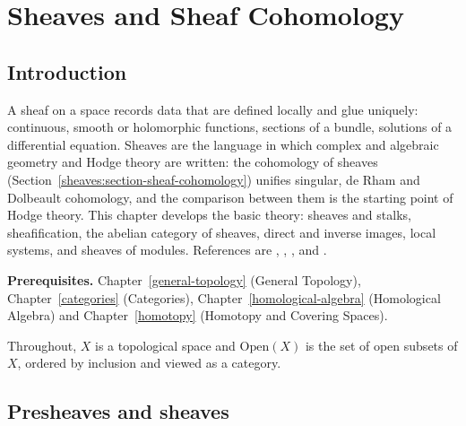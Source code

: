 \chapter{Sheaves and Sheaf Cohomology}\label{sheaves}

\section{Introduction}\label{sheaves:section-introduction}

A sheaf on a space records data that are defined locally and glue uniquely: continuous, smooth or holomorphic functions,
sections of a bundle, solutions of a differential equation. Sheaves are the language in which complex and algebraic geometry and
Hodge theory are written: the cohomology of sheaves (Section~\ref{sheaves:section-sheaf-cohomology}) unifies singular, de Rham and Dolbeault
cohomology, and the comparison between them is the starting point of Hodge theory. This chapter develops the basic theory: sheaves
and stalks, sheafification, the abelian category of sheaves, direct and inverse images, local systems, and sheaves of modules.
References are \cite{godement-faisceaux}, \cite{bredon-sheaf}, \cite{ks-sheaves-manifolds}, \cite[Chapter II]{hartshorne-ag} and
\cite{stacks-project}.

\noindent\textbf{Prerequisites.} Chapter~\ref{general-topology} (General Topology), Chapter~\ref{categories} (Categories),
Chapter~\ref{homological-algebra} (Homological Algebra) and Chapter~\ref{homotopy} (Homotopy and Covering Spaces).

Throughout, $X$ is a topological space and $\mathrm{Open}(X)$ is the set of open subsets of $X$, ordered by inclusion and viewed as a category.

\section{Presheaves and sheaves}\label{sheaves:section-sheaves}


